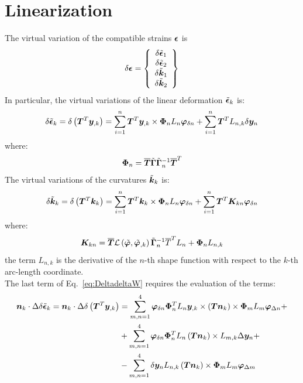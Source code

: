 \section{Linearization}
The virtual variation of the compatible strains $\T{\epsilon}$ is
\begin{equation}
\delta \T{\epsilon} =
\cubr{\vvect{c}{
\delta \tilde{\T{\epsilon} }_1 \\
\delta \tilde{\T{\epsilon} }_2 \\
\delta \tilde{\T{k} }_1 \\
\delta \tilde{\T{k} }_2 \\
}}
\end{equation}
In particular, the virtual variations of the linear deformation $\tilde{\T{\epsilon} }_k $ is:
\begin{equation}
\delta \tilde{\T{\epsilon} }_k  = \delta \plbr{ \T{T}^T \T{y}_{,k} } =
\sum_{i=1}^n \T{T}^T \T{y}_{,k} \times \T{\Phi}_{n} L_n \T{\varphi}_{\delta n} + \sum_{i=1}^n \T{T}^T L_{n,k} \delta \T{y}_{n}
\label{eq:delta_epsilon}
\end{equation}
where:
\begin{equation}
\T{\Phi}_{n} = \overline{\T{T}}  \tilde{ \T{\Gamma} } \tilde{ \T{\Gamma} }_n^{-1} \overline{\T{T}}^T
\end{equation}
The  virtual variations of the curvatures $\tilde{\T{k} }_k$ is:
\begin{equation}
\delta \tilde{\T{k} }_k = \delta \plbr{ \T{T}^T \T{k}_k } =
\sum_{i=1}^n \T{T}^T \T{k}_k \times \T{\Phi}_n L_n \T{\varphi}_{\delta n} + \sum_{i=1}^n \T{T}^T \T{K}_{kn} \T{\varphi}_{\delta n}
\label{eq:delta_k}
\end{equation}
where:
\begin{equation}
\T{K}_{kn} = \overline{\T{T}} \mathcal{L} \plbr{ \tilde{\T{\varphi}}, \tilde{\T{\varphi}}_{,k} } \tilde{ \T{\Gamma} }_{n}^{-1} \overline{T}^T L_n + \T{\Phi}_{n} L_{n,k}
\end{equation}
the term $L_{n,k}$ is the derivative of the $n$-th shape function with respect to the $k$-th arc-length coordinate.\\
The last term of Eq.~\ref{eq:DeltadeltaW} requires the evaluation of the terms:
\begin{equation}
\begin{split}
\T{n}_k \cdot \Delta \delta \tilde{\T{\epsilon}}_k =
\T{n}_k \cdot \Delta \delta \plbr{ \T{T}^T \T{y}_{,k} } & =
\sum_{m,n=1}^{4} \T{\varphi}_{\delta n} \T{\Phi}_{n}^T L_n \T{y}_{,k} \times \plbr{ \T{T} \T{n}_k } \times \T{\Phi}_m L_m  \T{\varphi}_{\Delta n} + \\
& + \sum_{m,n=1}^{4} \T{\varphi}_{\delta n} \T{\Phi}_{n}^T L_n \plbr{\T{T} \T{n}_k} \times L_{m,k} \Delta \T{y}_{n} + \\
& - \sum_{m,n=1}^{4} \delta \T{y}_n L_{n,k} \plbr{\T{T} \T{n}_k} \times \T{\Phi}_m L_m \T{\varphi}_{\Delta m}
\end{split}
\label{eq:Deltadelta_epsilon}
\end{equation}
